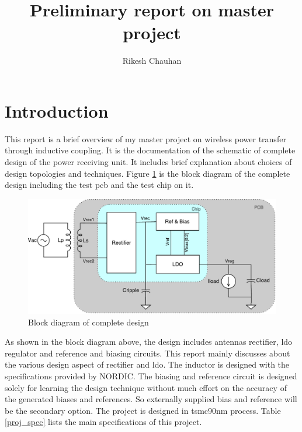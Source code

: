 \documentclass[12pt,a4paper,UKenglish]{article}
\title{Preliminary report on master project}
\author{Rikesh Chauhan}
\date{}
\begin{document}
\maketitle

\section{Introduction}
This report is a brief overview of my master project on wireless power transfer through inductive coupling. It is the documentation of the schematic of complete design of the power receiving unit. It includes brief explanation about choices of design topologies and techniques. Figure \ref{fig:blockd} is the block diagram of the complete design including the test \acrshort{pcb} and the test chip on it.

\begin{figure}[htbp] %
   \centering
   \includegraphics[width=\textwidth]{img/block_diagram.pdf}
   \caption{Block diagram of complete design}
   \label{fig:blockd}
\end{figure}

As shown in the block diagram above, the design includes antennas rectifier, \acrshort{ldo} regulator and reference and biasing circuits. This report mainly discusses about the various design aspect of rectifier and \acrshort{ldo}. The inductor is designed with the specifications provided by NORDIC. The biasing and reference circuit is designed solely for learning the design technique without much effort on the accuracy of the generated biases and references. So externally supplied bias and reference will be the secondary option. The project is designed in tsmc90nm process. Table \ref{proj_spec} lists the main specifications of this project.  \\ 
\end{document}
